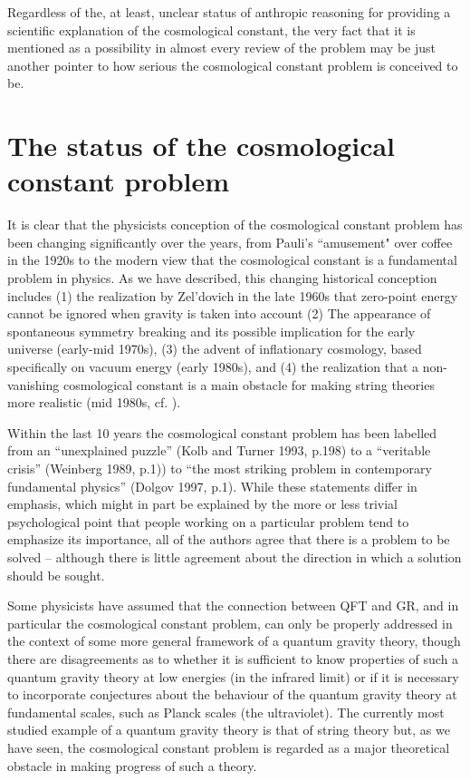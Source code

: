 \documentclass[12pt]{article}
\def\s{\section}
\begin{document}
Regardless of the, at least, unclear status of anthropic reasoning
for providing a scientific explanation of the cosmological
constant, the very fact that it is mentioned as a possibility in
almost every review of the problem may be just another pointer to
how serious the cosmological constant problem is conceived to be. \\

\s{The status of the cosmological constant problem}

It is clear that the physicists conception of the cosmological
constant problem has been changing significantly over the years,
from Pauli's ``amusement" over coffee in the 1920s to the modern
view that the cosmological constant is a fundamental problem in
physics. As we have described, this changing historical conception
includes (1) the realization by Zel'dovich in the late 1960s that
zero-point energy cannot be ignored when gravity is taken into
account (2) The appearance of spontaneous symmetry breaking and
its possible implication for the early universe (early-mid 1970s),
(3) the advent of inflationary cosmology, based specifically on
vacuum energy (early 1980s), and (4) the realization that a
non-vanishing cosmological constant is a main obstacle for making
string theories more realistic (mid 1980s, cf. \cite{witten97}).

Within the last 10 years the cosmological constant problem has
been labelled from an ``unexplained puzzle'' (Kolb and Turner
1993, \cite{kolb93} p.198) to a ``veritable crisis'' (Weinberg
1989, \cite{Weinberg89} p.1)) to ``the most striking problem in
contemporary fundamental physics'' (Dolgov 1997, \cite{dolgov97}
p.1). While these statements differ in emphasis, which might in
part be explained by the more or less trivial psychological point
that people working on a particular problem tend to emphasize its
importance, all of the authors agree that there is a problem to be
solved -- although there is little agreement about the direction
in which a solution should be sought.

Some physicists have assumed that the connection between QFT and GR,
and in particular the cosmological constant problem, can only be
properly addressed in the context of some more general framework of a
quantum gravity theory, though there are disagreements as to whether
it is sufficient to know properties of such a quantum gravity theory
at low energies (in the infrared limit) or if it is necessary to
incorporate conjectures about the behaviour of the quantum gravity
theory at fundamental scales, such as Planck scales (the ultraviolet).
The currently most studied example of a quantum gravity theory is that
of string theory but, as we have seen, the cosmological constant
problem is regarded as a major theoretical obstacle in making progress
of such a theory.
\end{document}
